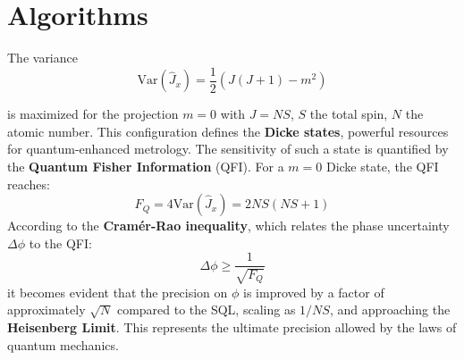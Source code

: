 \chapter{Algorithms}
\label{cha:appendix}
The variance 
\begin{equation}
    \text{Var}(\hat{J}_x) = \frac{1}{2} \left( J(J+1) - m^2 \right)
\end{equation}

is maximized for the projection $m = 0$ with $J = NS$, $S$ the total spin, $N$ the atomic number. This configuration defines the \textbf{Dicke states}, powerful resources for quantum-enhanced metrology. The sensitivity of such a state is quantified by the \textbf{Quantum Fisher Information} (QFI). For a $m=0$ Dicke state, the QFI reaches:
\begin{equation}
    F_Q = 4 \text{Var}(\hat{J}_x) = 2NS(NS+1)
\end{equation}
According to the \textbf{Cramér-Rao inequality}, which relates the phase uncertainty $\Delta \phi$ to the QFI:
\begin{equation}
    \Delta \phi \geq \frac{1}{\sqrt{F_Q}}
\end{equation}
it becomes evident that the precision on $\phi$ is improved by a factor of approximately $\sqrt{N}$ compared to the SQL, scaling as $1/NS$, and approaching the \textbf{Heisenberg Limit}. This represents the ultimate precision allowed by the laws of quantum mechanics.
